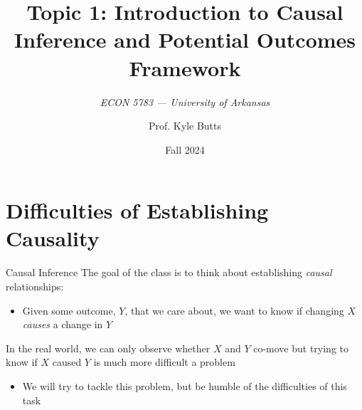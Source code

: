 \documentclass[aspectratio=169,t,11pt,table]{beamer}
\title{Topic 1: Introduction to Causal Inference and Potential Outcomes Framework}
\subtitle{\it  ECON 5783 — University of Arkansas}
\date{Fall 2024}
\author{Prof. Kyle Butts}
\begin{document}
\begin{frame}
  \maketitle

\end{frame}

\section{Difficulties of Establishing Causality}

\begin{frame}{Causal Inference}
  The goal of the class is to think about establishing \emph{causal} relationships:
  \begin{itemize}
    \item Given some outcome, $Y$, that we care about, we want to know if changing $X$ \emph{causes} a change in $Y$
  \end{itemize}
    
  \pause
  \bigskip
  In the real world, we can only observe whether $X$ and $Y$ co-move but trying to know if $X$ caused $Y$ is much more difficult a problem
  \begin{itemize}
    \item We will try to tackle this problem, but be humble of the difficulties of this task
  \end{itemize}
\end{frame}
\end{document}

